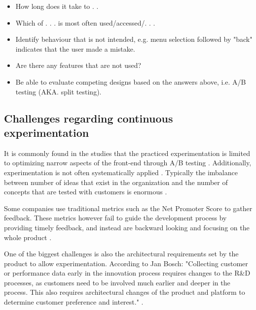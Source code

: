 \documentclass[english]{tktltiki2}
\theoremstyle{definition}
\theoremstyle{remark}
\begin{document}
\begin{itemize}
\item  How long does it take to . . 
\item  Which of . . . is most often used/accessed/. . .
\item  Identify behaviour that is not intended, e.g. menu selection followed by "back" indicates that the user made a mistake.
\item  Are there any features that are not used?
\item  Be able to evaluate competing designs based on the answers above, i.e. A/B testing (AKA. split testing).
\end{itemize}

\subsection{Challenges regarding continuous experimentation}
It is commonly found in the studies that the practiced experimentation is limited to optimizing narrow aspects of the front-end through A/B testing \cite{bosch2012building}. Additionally, experimentation is not often systematically applied \cite{bosch2012building}. Typically the imbalance between number of ideas that exist in the organization and the number of concepts that are tested with customers is enormous \cite{bosch2012building}. 

Some companies use traditional metrics such as the Net Promoter Score \cite{reichheld2003one} to gather feedback. These metrics however fail to guide the development process by providing timely feedback, and instead are backward looking and focusing on the whole product \cite{bosch2012building}.

One of the biggest challenges is also the architectural requirements set by the product to allow experimentation. According to Jan Bosch: "Collecting customer or performance data early in the innovation process requires changes to the R\&D processes, as customers need to be involved much earlier and deeper in the process. This also requires architectural changes of the product and platform to determine customer preference and interest." \cite{bosch2012building}.
\end{document}
